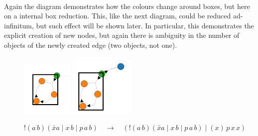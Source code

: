 \begin{examples}{~\\}
            Again the diagram demonstrates how the colours change around boxes, but here on a internal box reduction.
            This, like the next diagram, could be reduced ad-infinitum, but such effect will be shown later.
            In particular, this demonstrates the explicit creation of new nodes, but again there is ambiguity in the number of objects of the newly created edge (two objects, not one).
            \begin{figure}[H]
                \centering
                \includegraphics[width=0.22\textwidth]{diagrams/intra-box.png}
                \hspace{1in}
                \includegraphics[width=0.28\textwidth]{diagrams/intra-box-reduction.png}
                \caption*{$!(a \, b)(\bar{x} a \; | \; x \, b \; | \; p \, a \, b) \quad \rightarrow \quad (!(a \, b)(\bar{x} a \; | \; x \, b \; | \; p \, a \, b) \; | \; (x) \, p \, x \, x)$}
            \end{figure}~\\
            

\end{examples}
